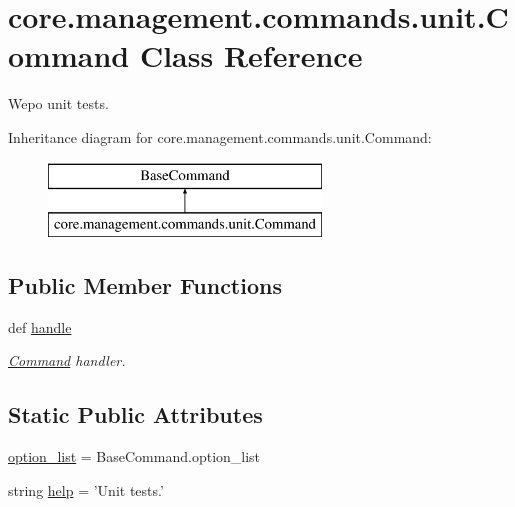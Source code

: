 \hypertarget{classcore_1_1management_1_1commands_1_1unit_1_1Command}{\section{core.\-management.\-commands.\-unit.\-Command Class Reference}
\label{classcore_1_1management_1_1commands_1_1unit_1_1Command}
}


Wepo unit tests.  


Inheritance diagram for core.\-management.\-commands.\-unit.\-Command\-:\begin{figure}[H]
\begin{center}
\leavevmode
\includegraphics[height=2.000000cm]{classcore_1_1management_1_1commands_1_1unit_1_1Command}
\end{center}
\end{figure}
\subsection*{Public Member Functions}
\begin{DoxyCompactItemize}
\item 
def \hyperlink{classcore_1_1management_1_1commands_1_1unit_1_1Command_a0f9ceb6f7eb04fbcad81d371a8cac8f9}{handle}
\begin{DoxyCompactList}\small\item\em \hyperlink{classcore_1_1management_1_1commands_1_1unit_1_1Command}{Command} handler. \end{DoxyCompactList}\end{DoxyCompactItemize}
\subsection*{Static Public Attributes}
\begin{DoxyCompactItemize}
\item 
\hyperlink{classcore_1_1management_1_1commands_1_1unit_1_1Command_a72c89b56acfcfbda87b8401adf0efa54}{option\-\_\-list} = Base\-Command.\-option\-\_\-list
\item 
string \hyperlink{classcore_1_1management_1_1commands_1_1unit_1_1Command_afa3ee03895753060f709326a6a403651}{help} = 'Unit tests.'
\end{DoxyCompactItemize}


